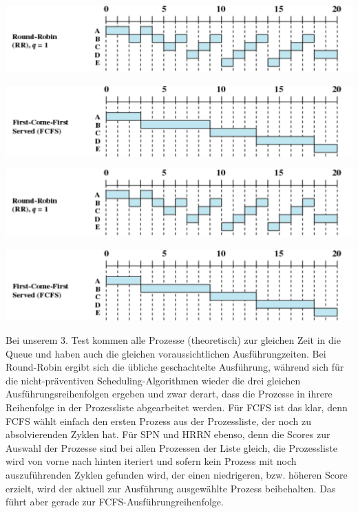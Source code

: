 \documentclass[numbers=noendperiod]{scrartcl}
\begin{document}
\begin{minipage}{0.8 \textwidth}
\includegraphics[width=\textwidth]{rr.pdf}
\end{minipage}
\newline

\begin{minipage}{0.8 \textwidth}
\includegraphics[width=\textwidth]{fcfs.pdf}
\end{minipage}
\newline

\begin{minipage}{0.8 \textwidth}
\includegraphics[width=\textwidth]{rr.pdf}
\end{minipage}
\newline

\begin{minipage}{0.8 \textwidth}
\includegraphics[width=\textwidth]{fcfs.pdf}
\end{minipage}
\newline

Bei unserem 3. Test kommen alle Prozesse (theoretisch) zur gleichen Zeit in die Queue und haben auch die gleichen voraussichtlichen Ausführungzeiten. Bei Round-Robin ergibt sich die übliche geschachtelte Ausführung, während sich für die nicht-präventiven Scheduling-Algorithmen wieder die drei gleichen Ausführungsreihenfolgen ergeben und zwar derart, dass die Prozesse in ihrere Reihenfolge in der Prozessliste abgearbeitet werden. Für FCFS ist das klar, denn FCFS wählt einfach den ersten Prozess aus der Prozessliste, der noch zu absolvierenden Zyklen hat. Für SPN und HRRN ebenso, denn die Scores zur Auswahl der Prozesse sind bei allen Prozessen der Liste gleich, die Prozessliste wird von vorne nach hinten iteriert und sofern kein Prozess mit noch auszuführenden Zyklen gefunden wird, der einen niedrigeren, bzw. höheren Score erzielt, wird der aktuell zur Ausführung ausgewählte Prozess beibehalten. Das führt aber gerade zur FCFS-Ausführungreihenfolge.
\end{document}
